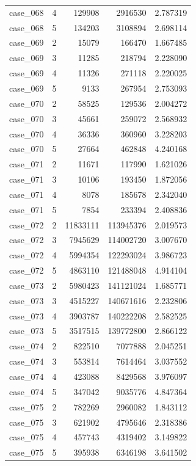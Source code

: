 \begin{longtable}{lrrrr}
case\_068 & 4 & 129908 & 2916530 & 2.787319 \\
case\_068 & 5 & 134203 & 3108894 & 2.698114 \\
case\_069 & 2 & 15079 & 166470 & 1.667485 \\
case\_069 & 3 & 11285 & 218794 & 2.228090 \\
case\_069 & 4 & 11326 & 271118 & 2.220025 \\
case\_069 & 5 & 9133 & 267954 & 2.753093 \\
case\_070 & 2 & 58525 & 129536 & 2.004272 \\
case\_070 & 3 & 45661 & 259072 & 2.568932 \\
case\_070 & 4 & 36336 & 360960 & 3.228203 \\
case\_070 & 5 & 27664 & 462848 & 4.240168 \\
case\_071 & 2 & 11671 & 117990 & 1.621026 \\
case\_071 & 3 & 10106 & 193450 & 1.872056 \\
case\_071 & 4 & 8078 & 185678 & 2.342040 \\
case\_071 & 5 & 7854 & 233394 & 2.408836 \\
case\_072 & 2 & 11833111 & 113945376 & 2.019573 \\
case\_072 & 3 & 7945629 & 114002720 & 3.007670 \\
case\_072 & 4 & 5994354 & 122293024 & 3.986723 \\
case\_072 & 5 & 4863110 & 121488048 & 4.914104 \\
case\_073 & 2 & 5980423 & 141121024 & 1.685771 \\
case\_073 & 3 & 4515227 & 140671616 & 2.232806 \\
case\_073 & 4 & 3903787 & 140222208 & 2.582525 \\
case\_073 & 5 & 3517515 & 139772800 & 2.866122 \\
case\_074 & 2 & 822510 & 7077888 & 2.045251 \\
case\_074 & 3 & 553814 & 7614464 & 3.037552 \\
case\_074 & 4 & 423088 & 8429568 & 3.976097 \\
case\_074 & 5 & 347042 & 9035776 & 4.847364 \\
case\_075 & 2 & 782269 & 2960082 & 1.843112 \\
case\_075 & 3 & 621902 & 4795646 & 2.318386 \\
case\_075 & 4 & 457743 & 4319402 & 3.149822 \\
case\_075 & 5 & 395938 & 6346198 & 3.641502 \\

\end{longtable}
